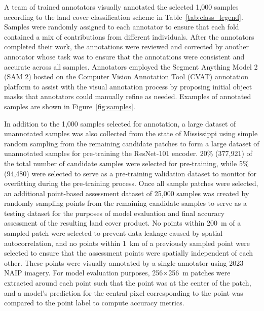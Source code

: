 

A team of trained annotators visually annotated the selected 1,000 samples according to the land cover classification scheme in Table~\ref{tab:class_legend}.
Samples were randomly assigned to each annotator to ensure that each fold contained a mix of contributions from different individuals.
After the annotators completed their work, the annotations were reviewed and corrected by another annotator whose task was to ensure that the annotations were consistent and accurate across all samples.
Annotators employed the Segment Anything Model 2 (SAM 2) hosted on the Computer Vision Annotation Tool (CVAT) annotation platform to assist with the visual annotation process \citep{cvat2023,raviSAM2Segment2024} by proposing initial object masks that annotators could manually refine as needed.
Examples of annotated samples are shown in Figure~\ref{fig:samples}.





In addition to the 1,000 samples selected for annotation, a large dataset of unannotated samples was also collected from the state of Mississippi using simple random sampling from the remaining candidate patches to form a large dataset of unannotated samples for pre-training the ResNet-101 encoder.
20\% (377,921) of the total number of candidate samples were selected for pre-training, while 5\% (94,480) were selected to serve as a pre-training validation dataset to monitor for overfitting during the pre-training process.
Once all sample patches were selected, an additional point-based assessment dataset of 25,000 samples was created by randomly sampling points from the remaining candidate samples to serve as a testing dataset for the purposes of model evaluation and final accuracy assessment of the resulting land cover product.
No points within \SI[number-unit-product={\text{ }}]{200}{\meter} of a sampled patch were selected to prevent data leakage caused by spatial autocorrelation, and no points within \SI[number-unit-product={\text{ }}]{1}{\kilo \meter} of a previously sampled point were selected to ensure that the assessment points were spatially independent of each other.
These points were visually annotated by a single annotator using 2023 NAIP imagery.
For model evaluation purposes, 256\(\times\)\SI{256}{\meter} patches were extracted around each point such that the point was at the center of the patch, and a model's prediction for the central pixel corresponding to the point was compared to the point label to compute accuracy metrics.

